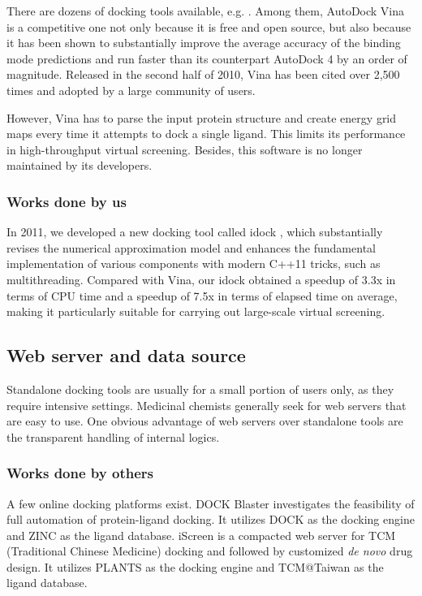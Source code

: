 \documentclass[a4paper,12pt]{article}
\begin{document}
There are dozens of docking tools available, e.g. \cite{595,607,617,650,596}. Among them, AutoDock Vina \cite{595} is a competitive one not only because it is free and open source, but also because it has been shown to substantially improve the average accuracy of the binding mode predictions \cite{595} and run faster than its counterpart AutoDock 4 \cite{596} by an order of magnitude. Released in the second half of 2010, Vina has been cited over 2,500 times and adopted by a large community of users.

However, Vina has to parse the input protein structure and create energy grid maps every time it attempts to dock a single ligand. This limits its performance in high-throughput virtual screening. Besides, this software is no longer maintained by its developers.

\subsubsection*{Works done by us}

In 2011, we developed a new docking tool called idock \cite{1153}, which substantially revises the numerical approximation model and enhances the fundamental implementation of various components with modern C++11 tricks, such as multithreading. Compared with Vina, our idock obtained a speedup of 3.3x in terms of CPU time and a speedup of 7.5x in terms of elapsed time on average, making it particularly suitable for carrying out large-scale virtual screening.

\subsection*{Web server and data source}

Standalone docking tools are usually for a small portion of users only, as they require intensive settings. Medicinal chemists generally seek for web servers that are easy to use. One obvious advantage of web servers over standalone tools are the transparent handling of internal logics.

\subsubsection*{Works done by others}

A few online docking platforms exist. DOCK Blaster \cite{557} investigates the feasibility of full automation of protein-ligand docking. It utilizes DOCK \cite{1222} as the docking engine and ZINC \cite{532,1178} as the ligand database. iScreen \cite{899} is a compacted web server for TCM (Traditional Chinese Medicine) docking and followed by customized \textit{de novo} drug design. It utilizes PLANTS \cite{610,607,779} as the docking engine and TCM@Taiwan \cite{528} as the ligand database.
\end{document}
